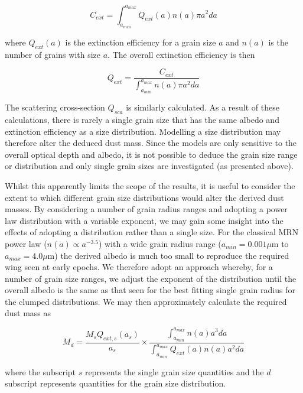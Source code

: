 \documentclass[useAMS,usenatbib,usegraphicx]{mnras}
\begin{document}
\begin{equation}
 C_{ext}=\int^{a_{max}}_{a_{min}} Q_{ext}(a) n(a) \pi a^2 da 
 \end{equation}

where $Q_{ext}(a)$ is the extinction efficiency for a grain size $a$ and $n(a)$ is the number of grains with size $a$. The overall extinction efficiency is then

\begin{equation}
 Q_{ext} = \frac{C_{ext}}{ \int^{a_{max}}_{a_{min}} n(a) \pi a^2 da} 
 \end{equation}
 
 


 
The scattering cross-section $Q_{sca}$ is similarly calculated.  As a result of these calculations, there is rarely a single grain size that has the same albedo and extinction efficiency as a size distribution.  Modelling a size distribution may therefore alter the deduced dust mass.  Since the models are only sensitive to the overall optical depth and albedo, it is not possible to deduce the grain size range or distribution and only single grain sizes are investigated (as presented above).

Whilst this apparently limits the scope of the results, it is useful to consider the extent to which different grain size distributions would alter the derived dust masses.  By considering a number of grain radius ranges and adopting a power law distribution with a variable exponent, we may gain some insight into the effects of adopting a distribution rather than a single size.  For the classical MRN power law ($n(a) \propto a^{-3.5}$) with a wide grain radius range ($a_{min} = 0.001 \mu$m to $a_{max} = 4.0 \mu$m) the derived albedo is much too small to reproduce the required wing seen at early epochs.  We therefore adopt an approach whereby, for a number of grain size ranges, we adjust the exponent of the distribution until the overall albedo is the same as that seen for the best fitting single grain radius for the clumped distributions.  We may then approximately calculate the required dust mass as

\begin{equation}
\label{distn_conv}
M_{d}= \frac{M_s Q_{ext,s}(a_s)}{a_s} \times \frac{\int^{a_{max}}_{a_{min}} n(a) a^3 da}{\int^{a_{max}}_{a_{min}} Q_{ext}(a) n(a) a^2 da}
\end{equation}

where the subscript $s$ represents the single grain size quantities and the $d$ subscript represents quantities for the grain size distribution.  
\end{document}
